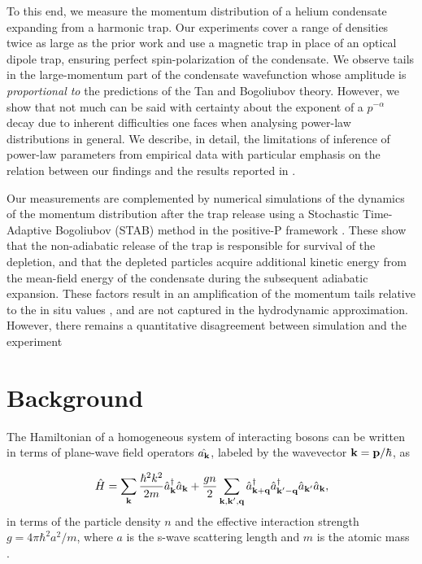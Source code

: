 	To this end, we measure the momentum distribution of a helium condensate expanding from a harmonic trap. 
	Our experiments cover a range of densities twice as large as the prior work and use a magnetic trap in place of an optical dipole trap, ensuring perfect spin-polarization of the condensate. 
	We observe tails in the large-momentum part of the condensate wavefunction whose amplitude is \emph{proportional to} the predictions of the Tan and Bogoliubov theory.
	However, we show that not much can be said with certainty about the exponent of a $p^{-\alpha}$ decay due to inherent difficulties one faces when analysing power-law distributions in general. 
	We describe, in detail, the limitations of inference of power-law parameters from empirical data with particular emphasis on the relation between our findings and the results reported in \cite{Chang16}.
	
	Our measurements are complemented by numerical simulations of the dynamics of the momentum distribution after the trap release using a Stochastic Time-Adaptive Bogoliubov (STAB) method in the positive-P framework \cite{Deuar11,Kheruntsyan12}. 
	These show that the non-adiabatic release of the trap is responsible for survival of the depletion, and that the depleted particles acquire additional kinetic energy from the mean-field energy of the condensate during the subsequent adiabatic expansion. 
	These factors result in an amplification of the momentum tails relative to the in situ values , and are not captured in the hydrodynamic approximation. 
	However, there remains a quantitative disagreement between simulation and the experiment 

	
\section{Background} 

	\noindent The Hamiltonian of a homogeneous system of interacting bosons can be written in terms of plane-wave field operators $\hat{a_{\textbf{k}}}$, labeled by the wavevector $\textbf{k}=\textbf{p}/\hbar$, as

	\begin{equation}
		\hat{H} = \sum_{\textbf{k}} \frac{\hbar^2k^2}{2m}\hat{a}_{\textbf{k}}^\dagger \hat{a}_{\textbf{k}} + \frac{g n}{2}\sum_{\textbf{k},\textbf{k}',{\bf q}}\hat{a}_{\textbf{k}+{\bf q}}^\dagger\hat{a}_{\textbf{k}'-{\bf q}}^\dagger \hat{a}_{\textbf{k}'}\hat{a}_{\textbf{k}},
	\end{equation}
	in terms of the particle density $n$ and the effective interaction strength $g=4\pi\hbar^2a^2/m$, where $a$ is the s-wave scattering length and $m$ is the atomic mass \cite{PitaevskiiStringari,PethickSmith}.
   

